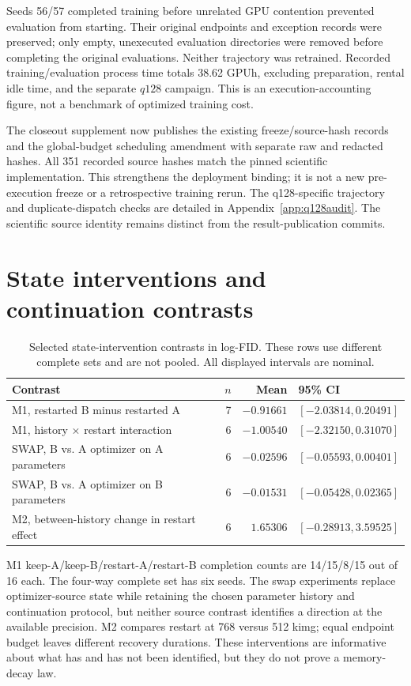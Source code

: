 Seeds 56/57 completed training before unrelated GPU contention prevented evaluation from starting. Their original endpoints and exception records were preserved; only empty, unexecuted evaluation directories were removed before completing the original evaluations. Neither trajectory was retrained. Recorded training/evaluation process time totals 38.62 GPUh, excluding preparation, rental idle time, and the separate $q128$ campaign. This is an execution-accounting figure, not a benchmark of optimized training cost.

The closeout supplement now publishes the existing freeze/source-hash records and the global-budget scheduling amendment with separate raw and redacted hashes. All 351 recorded source hashes match the pinned scientific implementation. This strengthens the deployment binding; it is not a new pre-execution freeze or a retrospective training rerun. The q128-specific trajectory and duplicate-dispatch checks are detailed in Appendix~\ref{app:q128audit}. The scientific source identity remains distinct from the result-publication commits.

\section{State interventions and continuation contrasts}
\label{app:state}
\begin{table}[htbp]
\centering\small
\caption{Selected state-intervention contrasts in log-FID. These rows use different complete sets and are not pooled. All displayed intervals are nominal.}
\begin{tabularx}{\linewidth}{YrrL{3.25cm}}
\toprule
Contrast & $n$ & Mean & 95\% CI\\
\midrule
M1, restarted B minus restarted A & 7 & $-0.91661$ & $[-2.03814,0.20491]$\\
M1, history $\times$ restart interaction & 6 & $-1.00540$ & $[-2.32150,0.31070]$\\
SWAP, B vs. A optimizer on A parameters & 6 & $-0.02596$ & $[-0.05593,0.00401]$\\
SWAP, B vs. A optimizer on B parameters & 6 & $-0.01531$ & $[-0.05428,0.02365]$\\
M2, between-history change in restart effect & 6 & $1.65306$ & $[-0.28913,3.59525]$\\
\bottomrule
\end{tabularx}
\end{table}
M1 keep-A/keep-B/restart-A/restart-B completion counts are 14/15/8/15 out of 16 each. The four-way complete set has six seeds. The swap experiments replace optimizer-source state while retaining the chosen parameter history and continuation protocol, but neither source contrast identifies a direction at the available precision. M2 compares restart at 768 versus 512 kimg; equal endpoint budget leaves different recovery durations. These interventions are informative about what has and has not been identified, but they do not prove a memory-decay law.


